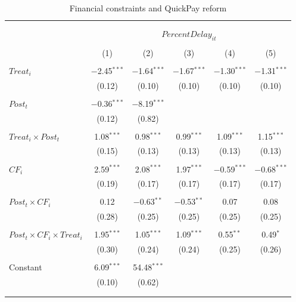 \documentclass[
]{article}
\begin{document}
\begin{table}[H] \centering 
  \caption{Financial constraints and QuickPay reform} 
  \label{} 
\small 
\begin{tabular}{@{\extracolsep{-2pt}}lccccc} 
\\[-1.8ex]\hline 
\hline \\[-1.8ex] 
\\[-1.8ex] & \multicolumn{5}{c}{$PercentDelay_{it}$  } \\ 
\\[-1.8ex] & (1) & (2) & (3) & (4) & (5)\\ 
\hline \\[-1.8ex] 
 $Treat_i$ & $-$2.45$^{***}$ & $-$1.64$^{***}$ & $-$1.67$^{***}$ & $-$1.30$^{***}$ & $-$1.31$^{***}$ \\ 
  & (0.12) & (0.10) & (0.10) & (0.10) & (0.10) \\ 
  & & & & & \\ 
 $Post_t$ & $-$0.36$^{***}$ & $-$8.19$^{***}$ &  &  &  \\ 
  & (0.12) & (0.82) &  &  &  \\ 
  & & & & & \\ 
 $Treat_i \times Post_t$ & 1.08$^{***}$ & 0.98$^{***}$ & 0.99$^{***}$ & 1.09$^{***}$ & 1.15$^{***}$ \\ 
  & (0.15) & (0.13) & (0.13) & (0.13) & (0.13) \\ 
  & & & & & \\ 
 $CF_i$ & 2.59$^{***}$ & 2.08$^{***}$ & 1.97$^{***}$ & $-$0.59$^{***}$ & $-$0.68$^{***}$ \\ 
  & (0.19) & (0.17) & (0.17) & (0.17) & (0.17) \\ 
  & & & & & \\ 
 $Post_t \times CF_i$ & 0.12 & $-$0.63$^{**}$ & $-$0.53$^{**}$ & 0.07 & 0.08 \\ 
  & (0.28) & (0.25) & (0.25) & (0.25) & (0.25) \\ 
  & & & & & \\ 
 $Post_t \times CF_i \times Treat_i$ & 1.95$^{***}$ & 1.05$^{***}$ & 1.09$^{***}$ & 0.55$^{**}$ & 0.49$^{*}$ \\ 
  & (0.30) & (0.24) & (0.24) & (0.25) & (0.26) \\ 
  & & & & & \\ 
 Constant & 6.09$^{***}$ & 54.48$^{***}$ &  &  &  \\ 
  & (0.10) & (0.62) &  &  &  \\ 
  & & & & & \\ 
\hline \\[-1.8ex] 

\end{tabular}
\end{table}
\end{document}
